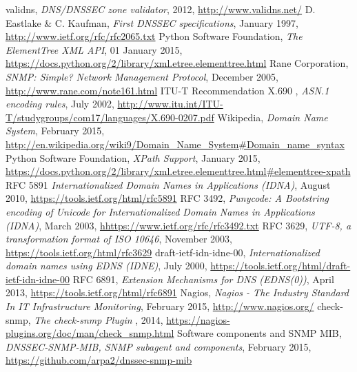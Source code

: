 \begin{thebibliography}{99}
 validns, {\em DNS/DNSSEC zone validator}, 2012, \url{http://www.validns.net/}
 D. Eastlake \& C. Kaufman, {\em First DNSSEC specifications}, January 1997, \url{http://www.ietf.org/rfc/rfc2065.txt}
 Python Software Foundation, {\em The ElementTree XML API}, 01 January 2015, \url{https://docs.python.org/2/library/xml.etree.elementtree.html}
 Rane Corporation, {\em SNMP: Simple? Network Management Protocol}, December  2005, \url{http://www.rane.com/note161.html}
 ITU-T Recommendation X.690 , {\em ASN.1 encoding rules}, July 2002, \url{http://www.itu.int/ITU-T/studygroups/com17/languages/X.690-0207.pdf}
 Wikipedia, {\em Domain Name System}, February  2015, \url{http://en.wikipedia.org/wiki9/Domain_Name_System#Domain_name_syntax}
 Python Software Foundation, {\em XPath Support}, January  2015, \url{https://docs.python.org/2/library/xml.etree.elementtree.html#elementtree-xpath}
 RFC 5891 {\em Internationalized Domain Names in Applications (IDNA)}, August 2010, \url{https://tools.ietf.org/html/rfc5891}
 RFC 3492, {\em Punycode: A Bootstring encoding of Unicode for Internationalized Domain Names in Applications (IDNA)}, March 2003, \url{hhttps://www.ietf.org/rfc/rfc3492.txt}
 RFC 3629, {\em UTF-8, a transformation format of ISO 10646}, November 2003, \url{https://tools.ietf.org/html/rfc3629}
 draft-ietf-idn-idne-00, {\em Internationalized domain names using EDNS (IDNE)}, July 2000, \url{https://tools.ietf.org/html/draft-ietf-idn-idne-00}
 RFC 6891, {\em Extension Mechanisms for DNS (EDNS(0))}, April 2013, \url{https://tools.ietf.org/html/rfc6891}
 Nagios, {\em Nagios - The Industry Standard In IT Infrastructure Monitoring}, February 2015, \url{http://www.nagios.org/}
 check-snmp, {\em The check-snmp Plugin }, 2014, \url{https://nagios-plugins.org/doc/man/check_snmp.html}
 Software components and SNMP MIB, {\em DNSSEC-SNMP-MIB, SNMP subagent and components}, February 2015, \url{https://github.com/arpa2/dnssec-snmp-mib}
\end{thebibliography}
